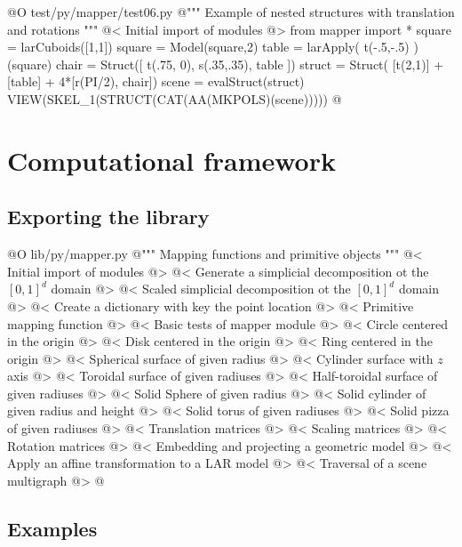 \documentclass[11pt,oneside]{article}	%
\begin{document}
@O test/py/mapper/test06.py
@{""" Example of nested structures with translation and rotations """
@< Initial import of modules @>
from mapper import *
square = larCuboids([1,1])
square = Model(square,2)
table = larApply( t(-.5,-.5) )(square)
chair = Struct([ t(.75, 0), s(.35,.35), table ])
struct = Struct( [t(2,1)] + [table] + 4*[r(PI/2), chair])
scene = evalStruct(struct)
VIEW(SKEL_1(STRUCT(CAT(AA(MKPOLS)(scene)))))
@}

\section{Computational framework}
\subsection{Exporting the library}
@O lib/py/mapper.py
@{""" Mapping functions and primitive objects """
@< Initial import of modules @>
@< Generate a simplicial decomposition ot the $[0,1]^d$ domain @>
@< Scaled simplicial decomposition ot the $[0,1]^d$ domain @>
@< Create a dictionary with key the point location @>
@< Primitive mapping function @>
@< Basic tests of mapper module @>
@< Circle centered in the origin @>
@< Disk centered in the origin @>
@< Ring centered in the origin @>
@< Spherical surface of given radius @>
@< Cylinder surface with $z$ axis @>
@< Toroidal surface of given radiuses @>
@< Half-toroidal surface of given radiuses @>
@< Solid Sphere of given radius @>
@< Solid cylinder of given radius and height @>
@< Solid torus of given radiuses @>
@< Solid pizza of given radiuses @>
@< Translation matrices @>
@< Scaling matrices @>
@< Rotation matrices @>
@< Embedding and projecting a geometric model @>
@< Apply an affine transformation to a LAR model @>
@< Traversal of a scene multigraph @>
@}
\subsection{Examples}
\end{document}
